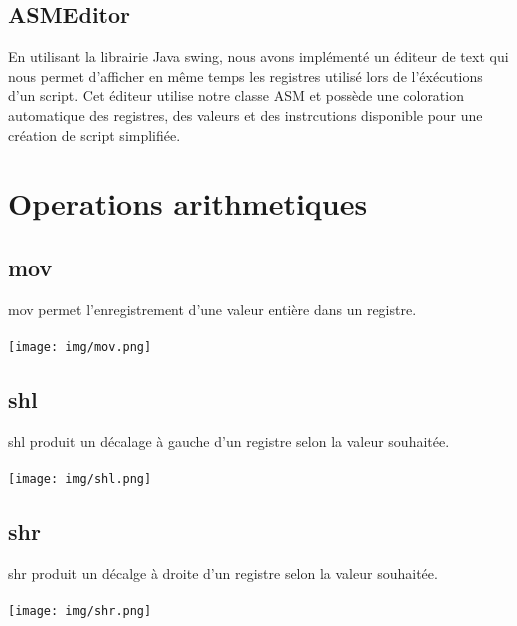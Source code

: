\documentclass{article}
\begin{document}
\subsection{ASMEditor}
En utilisant la librairie Java swing, nous avons implémenté un éditeur de text qui nous permet d'afficher en même temps
les registres utilisé lors de l'éxécutions d'un script. Cet éditeur utilise notre classe ASM et possède une coloration automatique
des registres, des valeurs et des instrcutions disponible pour une création de script simplifiée.

\section{Operations arithmetiques}
\subsection{mov}
mov permet l'enregistrement d'une valeur entière dans un registre.
\\
\\
\texttt{[image: img/mov.png]}

\subsection{shl}
shl produit un décalage à gauche d'un registre selon la valeur souhaitée.
\\
\\
\texttt{[image: img/shl.png]}

\subsection{shr}
shr produit un décalge à droite d'un registre selon la valeur souhaitée.
\\
\\
\texttt{[image: img/shr.png]}
\end{document}
